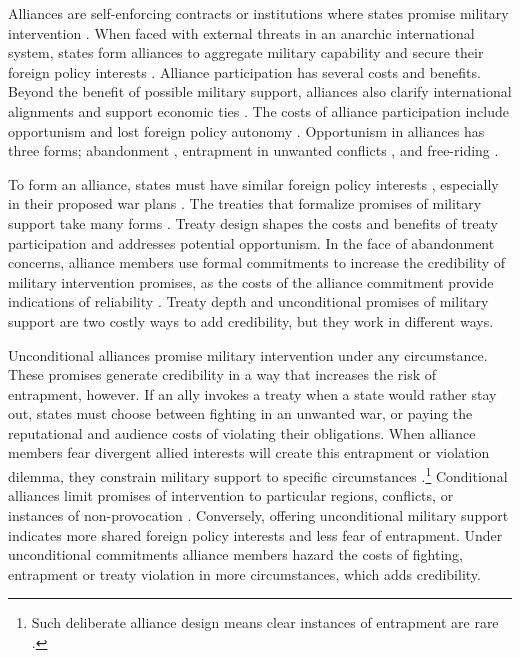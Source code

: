 \documentclass[12pt]{article}
\begin{document}
Alliances are self-enforcing contracts or institutions where states promise military intervention \citep{Leedsetal2002, Morrow2000}. 
When faced with external threats in an anarchic international system, states form alliances to aggregate military capability and secure their foreign policy interests \citep{Altfield1984, Smith1995, Snyder1997, FordhamPoast2014}.
Alliance participation has several costs and benefits.
Beyond the benefit of possible military support, alliances also clarify international alignments \citep{Snyder1990} and support economic ties \citep{Gowa1995, Li2003, Long2003, Fordham2010, WolfordKim2017}.  
The costs of alliance participation include opportunism and lost foreign policy autonomy \citep{Altfield1984, Morrow2000, Johnson2015}. 
Opportunism in alliances has three forms; abandonment \citep{Leeds2003a, BerkemeierFuhrmann2018}, entrapment in unwanted conflicts \citep{Snyder1984}, and free-riding \citep{Morrow2000}.


To form an alliance, states must have similar foreign policy interests \citep{Morrow1991, Smith1995, FordhamPoast2014}, especially in their proposed war plans \citep{Poast2019a}. 
The treaties that formalize promises of military support take many forms \citep{Leedsetal2000, Leedsetal2002, Benson2012, BensonClinton2016}. 
Treaty design shapes the costs and benefits of treaty participation and addresses potential opportunism.  
In the face of abandonment concerns, alliance members use formal commitments to increase the credibility of military intervention promises, as the costs of the alliance commitment provide indications of reliability \citep{Morrow2000}. 
Treaty depth and unconditional promises of military support are two costly ways to add credibility, but they work in different ways.  


Unconditional alliances promise military intervention under any circumstance. 
These promises generate credibility in a way that increases the risk of entrapment, however. 
If an ally invokes a treaty when a state would rather stay out, states must choose between fighting in an unwanted war, or paying the reputational \citep{Gibler2008, Crescenzietal2012} and audience \citep{Fearon1997} costs of violating their obligations.
When alliance members fear divergent allied interests will create this entrapment or violation dilemma, they constrain military support to specific circumstances \citep{Kim2011, Benson2012}.\footnote{Such deliberate alliance design means clear instances of entrapment are rare \citep{Kim2011, Beckley2015}.} 
Conditional alliances limit promises of intervention to particular regions, conflicts, or instances of non-provocation \citep{Leedsetal2000}. 
Conversely, offering unconditional military support indicates more shared foreign policy interests and less fear of entrapment.
Under unconditional commitments alliance members hazard the costs of fighting, entrapment or treaty violation in more circumstances, which adds credibility.  
\end{document}
